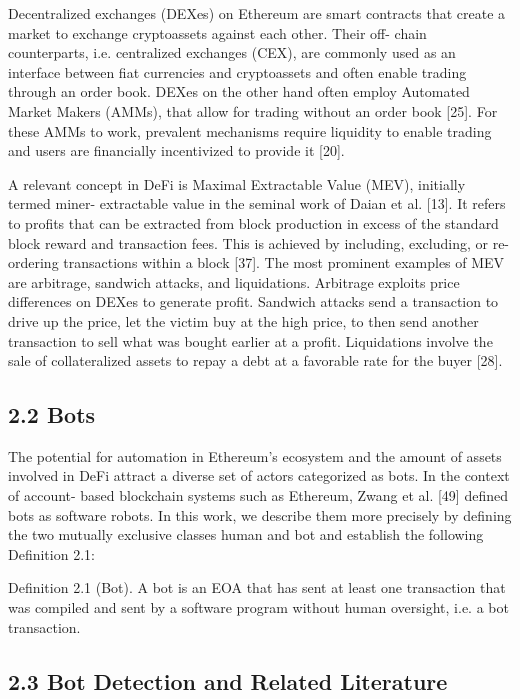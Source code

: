 Decentralized exchanges (DEXes) on Ethereum are smart contracts that create a market to exchange cryptoassets against each other. Their off- chain counterparts, i.e. centralized exchanges (CEX), are commonly used as an interface between fiat currencies and cryptoassets and often enable trading through an order book. DEXes on the other hand often employ Automated Market Makers (AMMs), that allow for trading without an order book [25]. For these AMMs to work, prevalent mechanisms require liquidity to enable trading and users are financially incentivized to provide it [20].

A relevant concept in DeFi is Maximal Extractable Value (MEV), initially termed miner- extractable value in the seminal work of Daian et al. [13]. It refers to profits that can be extracted from block production in excess of the standard block reward and transaction fees. This is achieved by including, excluding, or re- ordering transactions within a block [37]. The most prominent examples of MEV are arbitrage, sandwich attacks, and liquidations. Arbitrage exploits price differences on DEXes to generate profit. Sandwich attacks send a transaction to drive up the price, let the victim buy at the high price, to then send another transaction to sell what was bought earlier at a profit. Liquidations involve the sale of collateralized assets to repay a debt at a favorable rate for the buyer [28].

\subsection*{2.2 Bots}

The potential for automation in Ethereum's ecosystem and the amount of assets involved in DeFi attract a diverse set of actors categorized as bots. In the context of account- based blockchain systems such as Ethereum, Zwang et al. [49] defined bots as software robots. In this work, we describe them more precisely by defining the two mutually exclusive classes human and bot and establish the following Definition 2.1:

Definition 2.1 (Bot). A bot is an EOA that has sent at least one transaction that was compiled and sent by a software program without human oversight, i.e. a bot transaction.

\subsection*{2.3 Bot Detection and Related Literature}

